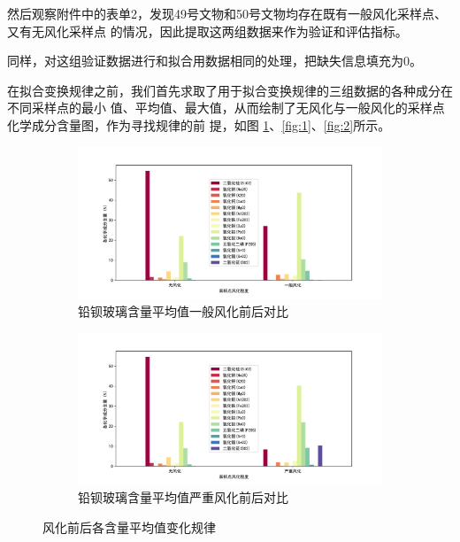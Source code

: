 \documentclass[withoutpreface,bwprint]{cumcmthesis} %
\begin{document}
然后观察附件中的表单2，发现49号文物和50号文物均存在既有一般风化采样点、又有无风化采样点
的情况，因此提取这两组数据来作为验证和评估指标。

同样，对这组验证数据进行和拟合用数据相同的处理，把缺失信息填充为0。

在拟合变换规律之前，我们首先求取了用于拟合变换规律的三组数据的各种成分在不同采样点的最小
值、平均值、最大值，从而绘制了无风化与一般风化的采样点化学成分含量图，作为寻找规律的前
提，如图 \ref{fig:0}、\ref{fig:1}、\ref{fig:2}所示。
\begin{figure}[!htb]
    \centering
    \begin{subfigure}{0.4\textwidth}
        \centering
        \includegraphics[scale=0.25]{铅钡玻璃含量平均值一般风化前后对比.pdf}
        \caption{铅钡玻璃含量平均值一般风化前后对比}
    \end{subfigure}
    \begin{subfigure}{0.4\textwidth}
        \centering
        \includegraphics[scale=0.25]{铅钡玻璃含量平均值严重风化前后对比.pdf}
        \caption{铅钡玻璃含量平均值严重风化前后对比}
    \end{subfigure}
    \caption{风化前后各含量平均值变化规律}
    \label{fig:0}
\end{figure}
\end{document}
